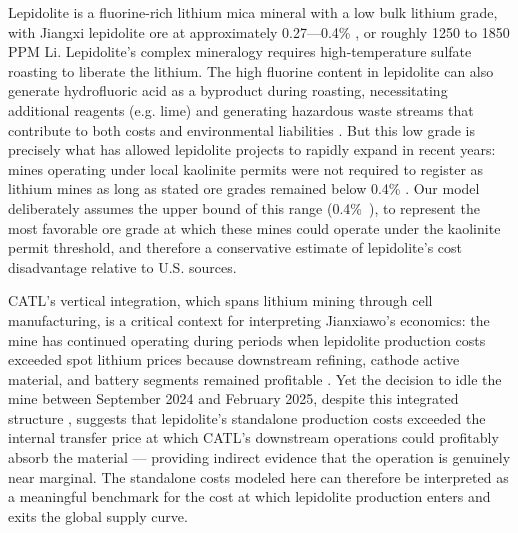 \documentclass{article}
\renewcommand\_{\textunderscore\allowbreak}
\begin{document}
Lepidolite is a fluorine-rich lithium mica mineral with a low bulk lithium grade, with Jiangxi lepidolite ore at approximately 0.27---0.4\%  \cite{sulcaLithiumPricesWhere2024}, or roughly 1250 to 1850 PPM Li.  Lepidolite's complex mineralogy requires high-temperature sulfate roasting to liberate the lithium. The high fluorine content in lepidolite can also generate hydrofluoric acid as a byproduct during roasting, necessitating additional reagents (e.g. lime) and generating hazardous waste streams that contribute to both costs and environmental liabilities \cite{yanExtractionLithiumLepidolite2012, dengSystematicReviewSulfate2026}. But this low grade is precisely what has allowed lepidolite projects to rapidly expand in recent years: mines operating under local kaolinite permits were not required to register as lithium mines as long as stated ore grades remained below 0.4\% \cite{zhangChinaHasDomestic2025}. Our model deliberately assumes the upper bound of this range (0.4\%~), to represent the most favorable ore grade at which these mines could operate under the kaolinite permit threshold, and therefore a conservative estimate of lepidolite's cost disadvantage relative to U.S. sources.

CATL's vertical integration, which spans lithium mining through cell manufacturing, is a critical context for interpreting Jianxiawo's economics: the mine has continued operating during periods when lepidolite production costs exceeded spot lithium prices because downstream refining, cathode active material, and battery segments remained profitable \cite{jamasmieCATLCutLithium2024}. Yet the decision to idle the mine between September 2024 and February 2025, despite this integrated structure \cite{benchmarkteamCATLSuspendsOperations}, suggests that lepidolite's standalone production costs exceeded the internal transfer price at which CATL's downstream operations could profitably absorb the material — providing indirect evidence that the operation is genuinely near marginal. The standalone costs modeled here can therefore be interpreted as a meaningful benchmark for the cost at which lepidolite production enters and exits the global supply curve.
\end{document}
